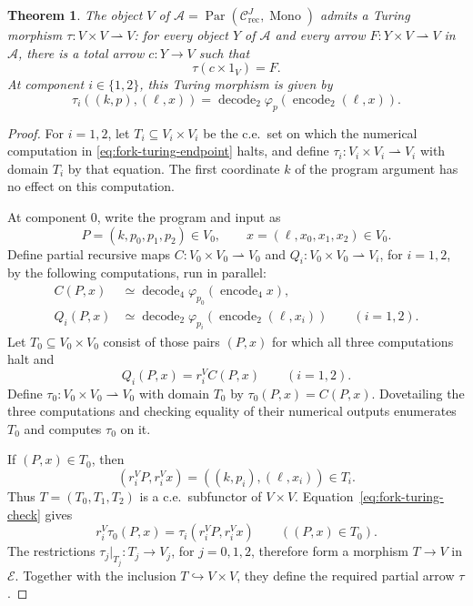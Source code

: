 \documentclass[11pt]{article}
\newtheorem{theorem}{Theorem}[section]
\begin{document}
\begin{theorem}\label{thm:fork-turing}
The object $V$ of
$\mathcal A=\operatorname{Par}(\mathcal C_{\mathrm{rec}}^J,
\operatorname{Mono})$ admits a Turing morphism
$\tau:V\times V\rightharpoonup V$: for every object $Y$ of
$\mathcal A$ and every arrow $F:Y\times V\rightharpoonup V$
in $\mathcal A$, there is a total arrow
$c:Y\to V$ such that
\[
 \tau(c\times1_V)=F.
\]
At component $i\in\{1,2\}$, this Turing morphism is given by
\begin{equation}\label{eq:fork-turing-endpoint}
 \tau_i((k,p),(\ell,x))
 =\operatorname{decode}_2
     \varphi_p(\operatorname{encode}_2(\ell,x)).
\end{equation}
\end{theorem}

\begin{proof}
For $i=1,2$, let $T_i\subseteq V_i\times V_i$ be the c.e.\ set
on which the numerical computation in
\eqref{eq:fork-turing-endpoint} halts, and define
$\tau_i:V_i\times V_i\rightharpoonup V_i$ with domain $T_i$
by that equation. The first coordinate $k$
of the program argument has no effect on this computation.

At component $0$, write the program and input as
\[
 P=(k,p_0,p_1,p_2)\in V_0,
 \qquad x=(\ell,x_0,x_1,x_2)\in V_0.
\]
Define partial recursive maps
$C:V_0\times V_0\rightharpoonup V_0$ and
$Q_i:V_0\times V_0\rightharpoonup V_i$, for $i=1,2$,
by the following computations, run in parallel:
\begin{align*}
 C(P,x)&\simeq
   \operatorname{decode}_4
      \varphi_{p_0}(\operatorname{encode}_4 x),\\
 Q_i(P,x)&\simeq
   \operatorname{decode}_2
      \varphi_{p_i}(\operatorname{encode}_2(\ell,x_i))
      \qquad(i=1,2).
\end{align*}
Let $T_0\subseteq V_0\times V_0$ consist of those pairs $(P,x)$
for which all three computations halt and
\begin{equation}\label{eq:fork-turing-check}
 Q_i(P,x)=r_i^V C(P,x)\qquad(i=1,2).
\end{equation}
Define $\tau_0:V_0\times V_0\rightharpoonup V_0$ with domain
$T_0$ by $\tau_0(P,x)=C(P,x)$.
Dovetailing the three computations and checking equality of their
numerical outputs enumerates $T_0$ and computes $\tau_0$ on it.

If $(P,x)\in T_0$, then
\[
 (r_i^V P,r_i^V x)=((k,p_i),(\ell,x_i))\in T_i.
\]
Thus $T=(T_0,T_1,T_2)$ is a c.e.\ subfunctor of $V\times V$.
Equation~\eqref{eq:fork-turing-check} gives
\[
 r_i^V\tau_0(P,x)
   =\tau_i(r_i^V P,r_i^V x)
 \qquad((P,x)\in T_0).
\]
The restrictions $\tau_j|_{T_j}:T_j\to V_j$, for $j=0,1,2$,
therefore form a morphism $T\to V$ in $\mathcal E$.
Together with the inclusion $T\hookrightarrow V\times V$,
they define the required partial arrow $\tau$.


\end{proof}
\end{document}
